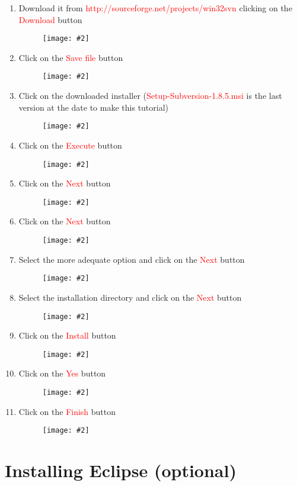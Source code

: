 \documentclass[a4paper]{article}
\newcommand{\FIG}[2]
{
	\begin{figure}[ht!]
	\centering
	\texttt{[image: \#2]}
	\end{figure}
}
\newcommand{\FIGUREB}[1]{\FIG{0.26}{#1}}
\newcommand{\RED}[1] {\textcolor{red}{#1}}
\begin{document}
\begin{enumerate}

\item Download it from \RED{http://sourceforge.net/projects/win32svn} clicking
on the \RED{Download} button
\FIGUREB{subversion-1.png}

\clearpage

\item Click on the \RED{Save file} button
\FIGUREB{subversion-2.png}

\item Click on the downloaded installer (\RED{Setup-Subversion-1.8.5.msi} is the
last version at the date to make this tutorial)
\FIGUREB{subversion-3.png}

\clearpage

\item Click on the \RED{Execute} button
\FIGUREB{subversion-4.png}

\item Click on the \RED{Next} button
\FIGUREB{subversion-5.png}

\clearpage

\item Click on the \RED{Next} button
\FIGUREB{subversion-6.png}

\item Select the more adequate option and click on the \RED{Next} button
\FIGUREB{subversion-7.png}

\clearpage

\item Select the installation directory and click on the \RED{Next} button
\FIGUREB{subversion-8.png}

\item Click on the \RED{Install} button
\FIGUREB{subversion-9.png}

\clearpage

\item Click on the \RED{Yes} button
\FIGUREB{subversion-10.png}

\item Click on the \RED{Finish} button
\FIGUREB{subversion-11.png}

\end{enumerate}

\clearpage

\section{Installing Eclipse (optional)}
\end{document}

